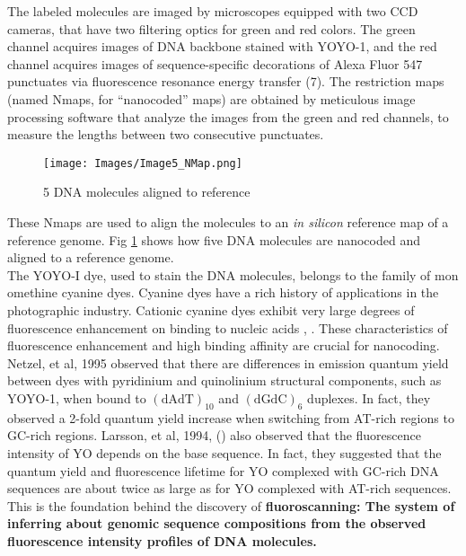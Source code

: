The labeled molecules are imaged by microscopes equipped with two CCD cameras, that have two filtering optics for green and red colors. The green channel acquires images of DNA backbone stained with YOYO-1, and the red channel acquires images of sequence-specific decorations of Alexa Fluor 547 punctuates via fluorescence resonance energy transfer (7). The restriction maps (named Nmaps, for ``nanocoded'' maps) are obtained by meticulous image processing software that analyze the images from the green and red channels, to measure the lengths between two consecutive punctuates. 

\begin{figure}[H]
\begin{center}
\texttt{[image: Images/Image5\_NMap.png]}
\end{center}
\caption{5 DNA molecules aligned to reference}
\label{fig:Fig2_NMap}
\end{figure}

These Nmaps are used to align the molecules to an {\emph{in silicon}} reference map of a reference genome. Fig \ref{fig:Fig2_NMap} shows how five DNA molecules are nanocoded and aligned to a reference genome. \\

The YOYO-I dye, used to stain the DNA molecules, belongs to the family of mon
omethine cyanine dyes. Cyanine dyes have a rich history of applications in the photographic industry. Cationic cyanine dyes exhibit very large degrees of fluorescence enhancement on binding to nucleic acids \cite{Rye_etal_1992_NAR}, \cite{Lee_etal_1986_Cytometry}. These characteristics of fluorescence enhancement and high binding affinity are crucial for nanocoding. Netzel, et al, 1995 \cite{Netzel_etal_1995_JPC} observed that there are differences in emission quantum yield between dyes with pyridinium and quinolinium structural components, such as YOYO-1, when bound to $(\text{dAdT})_{10}$ and $(\text{dGdC})_6$ duplexes. In fact, they observed a 2-fold quantum yield increase when switching from AT-rich regions to GC-rich regions. Larsson, et al, 1994, (\cite{Larsson_etal_1994_JACS}) also observed that the fluorescence intensity of YO depends on the base sequence. In fact, they suggested that the quantum yield and fluorescence lifetime for YO complexed with GC-rich DNA sequences are about twice as large as for YO complexed with AT-rich sequences. This is the foundation behind the discovery of {\bf{fluoroscanning: The system of inferring about genomic sequence compositions from the observed fluorescence intensity profiles of DNA molecules.}} 

